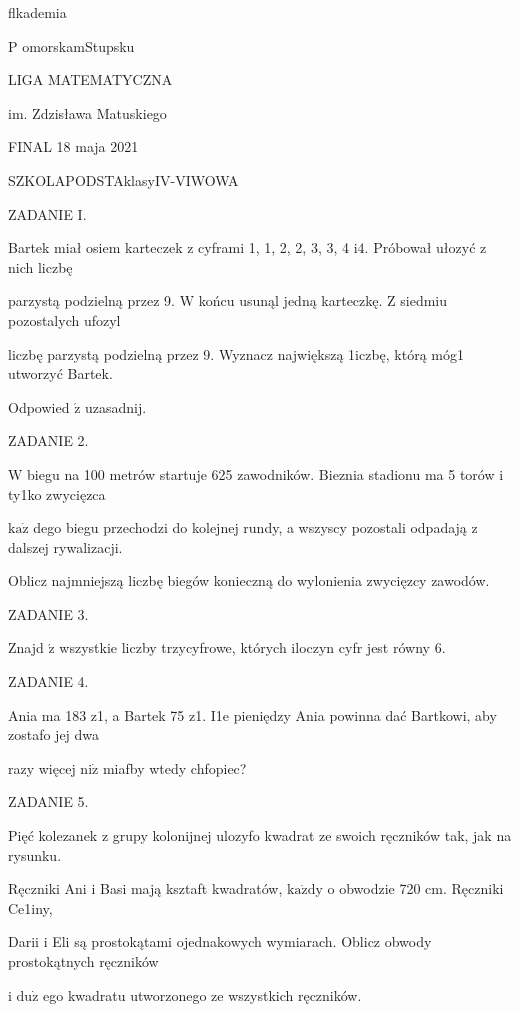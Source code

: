 \documentclass[a4paper,12pt]{article}
\begin{document}
flkademia

P omorskamStupsku

LIGA MATEMATYCZNA

im. Zdzisława Matuskiego

FINAL 18 maja 2021

SZKOLAPODSTAklasyIV-VIWOWA

ZADANIE I.

Bartek miał osiem karteczek z cyframi 1, 1, 2, 2, 3, 3, 4 $\mathrm{i}4$. Próbował ułozyć z nich liczbę

parzystą podzielną przez 9. $\mathrm{W}$ końcu usunąl jedną karteczkę. $\mathrm{Z}$ siedmiu pozostalych ufozyl

liczbę parzystą podzielną przez 9. Wyznacz największą 1iczbę, którą móg1 utworzyć Bartek.

Odpowied $\acute{\mathrm{z}}$ uzasadnij.

ZADANIE 2.

$\mathrm{W}$ biegu na 100 metrów startuje 625 zawodników. Bieznia stadionu ma 5 torów i ty1ko zwycięzca

$\mathrm{k}\mathrm{a}\dot{\mathrm{z}}$ dego biegu przechodzi do kolejnej rundy, a wszyscy pozostali odpadają z dalszej rywalizacji.

Oblicz najmniejszą liczbę biegów konieczną do wylonienia zwycięzcy zawodów.

ZADANIE 3.

Znajd $\acute{\mathrm{z}}$ wszystkie liczby trzycyfrowe, których iloczyn cyfr jest równy 6.

ZADANIE 4.

Ania ma 183 z1, a Bartek 75 z1. I1e pieniędzy Ania powinna dać Bartkowi, aby zostafo jej dwa

razy więcej $\mathrm{n}\mathrm{i}\dot{\mathrm{z}}$ miafby wtedy chfopiec?

ZADANIE 5.

Pięć kolezanek z grupy kolonijnej ulozyfo kwadrat ze swoich ręczników tak, jak na rysunku.

Ręczniki Ani i Basi mają ksztaft kwadratów, $\mathrm{k}\mathrm{a}\dot{\mathrm{z}}\mathrm{d}\mathrm{y}$ o obwodzie 720 cm. Ręczniki Ce1iny,

Darii i Eli są prostokątami ojednakowych wymiarach. Oblicz obwody prostokątnych ręczników

i $\mathrm{d}\mathrm{u}\dot{\mathrm{z}}$ ego kwadratu utworzonego ze wszystkich ręczników.
\end{document}
